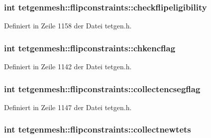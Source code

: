 \hypertarget{classtetgenmesh_1_1flipconstraints_a4eb3f0e12749cae8b73f0f80e6f7748c}{
\subsubsection[{checkflipeligibility}]{\setlength{\rightskip}{0pt plus 5cm}int tetgenmesh\-::flipconstraints\-::checkflipeligibility}}\label{classtetgenmesh_1_1flipconstraints_a4eb3f0e12749cae8b73f0f80e6f7748c}


Definiert in Zeile 1158 der Datei tetgen.\-h.

\hypertarget{classtetgenmesh_1_1flipconstraints_a5cb16eed34f6726058a81ff226f138f7}{
\subsubsection[{chkencflag}]{\setlength{\rightskip}{0pt plus 5cm}int tetgenmesh\-::flipconstraints\-::chkencflag}}\label{classtetgenmesh_1_1flipconstraints_a5cb16eed34f6726058a81ff226f138f7}


Definiert in Zeile 1142 der Datei tetgen.\-h.

\hypertarget{classtetgenmesh_1_1flipconstraints_ae443417bfee2fe2d138ef19d1661668d}{
\subsubsection[{collectencsegflag}]{\setlength{\rightskip}{0pt plus 5cm}int tetgenmesh\-::flipconstraints\-::collectencsegflag}}\label{classtetgenmesh_1_1flipconstraints_ae443417bfee2fe2d138ef19d1661668d}


Definiert in Zeile 1147 der Datei tetgen.\-h.

\hypertarget{classtetgenmesh_1_1flipconstraints_abddbd27770a07502372a20c9d0dd346d}{
\subsubsection[{collectnewtets}]{\setlength{\rightskip}{0pt plus 5cm}int tetgenmesh\-::flipconstraints\-::collectnewtets}}\label{classtetgenmesh_1_1flipconstraints_abddbd27770a07502372a20c9d0dd346d}


